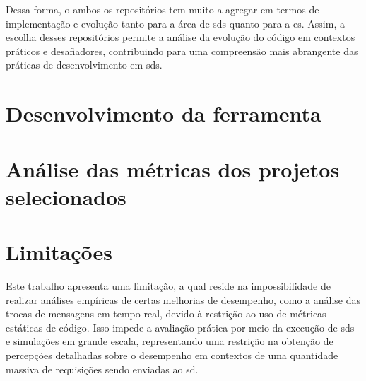 Dessa forma, o ambos os repositórios tem muito a agregar em termos de implementação e evolução tanto para a área de \gls{sds} quanto para a \gls{es}. Assim, a escolha desses repositórios permite a análise da evolução do código em contextos práticos e desafiadores, contribuindo para uma compreensão mais abrangente das práticas de desenvolvimento em \gls{sds}.

\section{Desenvolvimento da ferramenta}

\section{Análise das métricas dos projetos selecionados}

\section{Limitações}
\label{sec:limitacoes}

Este trabalho apresenta uma limitação, a qual reside na impossibilidade de realizar análises empíricas de certas melhorias de desempenho, como a análise das trocas de mensagens em tempo real, devido à restrição ao uso de métricas estáticas de código. Isso impede a avaliação prática por meio da execução de \gls{sds} e simulações em grande escala, representando uma restrição na obtenção de percepções detalhadas sobre o desempenho em contextos de uma quantidade massiva de requisições sendo enviadas ao \gls{sd}.